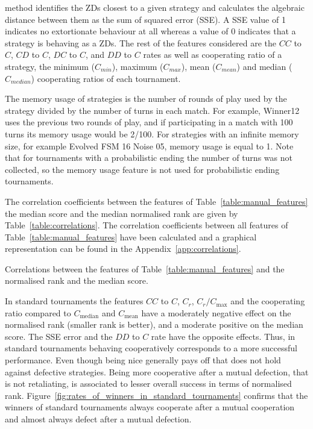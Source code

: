 \documentclass{article}
\begin{document}
\begin{table}[!htbp]
{    method identifies the ZDs closest to a given strategy and calculates the
    algebraic distance between them as the sum of squared error (SSE). A SSE value of 1 indicates
    no extortionate behaviour at all whereas a value of 0 indicates that a
    strategy is behaving as a ZDs. The rest of the features considered are the $CC$
    to $C$, $CD$ to $C$, $DC$ to $C$, and $DD$ to $C$ rates as well as
    cooperating ratio of a strategy, the minimum (\(C_{min}\)), maximum
    (\(C_{max}\)), mean (\(C_{mean}\)) and median (\(C_{median}\)) cooperating
    ratios of each tournament.}
    \label{table:manual_features}
\end{table}

The memory usage of strategies is the number of
rounds of play used by the strategy divided by the number of turns in each match.
For example, Winner12 uses the previous two rounds of play, and if participating
in a match with 100 turns its memory usage would be 2/100.
For strategies with an infinite memory size, for example Evolved
FSM 16 Noise 05, memory usage is equal to 1.
Note that for tournaments with a probabilistic
ending the number of turns was not collected, so the memory usage feature is not
used for probabilistic ending tournaments.

The correlation coefficients between the features of
Table~\ref{table:manual_features} the median score and the median normalised
rank are given by Table~\ref{table:correlations}. The correlation coefficients
between all features of Table~\ref{table:manual_features} have been calculated
and a graphical representation can be found in the
Appendix~\ref{app:correlations}.

\begin{table}[!htbp]
    \begin{center}
    \resizebox{.9\textwidth}{!}{
        
    }
\end{center}
\caption{Correlations between the features of Table~\ref{table:manual_features}
and the normalised rank and the median score.}\label{table:correlations}
\end{table}

In standard tournaments the features $CC$ to $C$, $C_r$, $C_r / C_{\text{max}}$
and the cooperating ratio compared to $C_{\text{median}}$ and $C_{\text{mean}}$
have a moderately negative effect on the normalised rank (smaller rank is better), and a moderate positive
on the median score. The SSE error and the $DD$ to $C$ rate have the opposite
effects. Thus, in standard tournaments behaving cooperatively corresponds to a
more successful performance. Even though being nice generally pays off
that does not hold against defective strategies. Being more cooperative after a mutual
defection, that is not retaliating, is associated to lesser overall success in terms of normalised rank.
Figure~\ref{fig:rates_of_winners_in_standard_tournaments} confirms that the
winners of standard tournaments always cooperate after a mutual cooperation and
almost always defect after a mutual defection.
\end{document}
